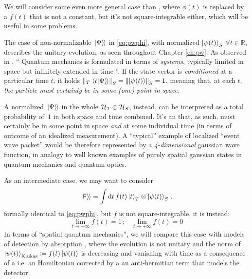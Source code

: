 We will consider some even more general case than \cite{Lloyd:Time},
where $\phi(t)$ is replaced by a $f(t)$ that is not a constant,
but it's not square-integrable either,
which will be useful in some problems.

The case of non-normalizable $\left.\left| \Psi \right\rangle\hspace{-0.115em}\right\rangle$ in \eqref{eq:pwphi},
with normalized $\ket{\psi(t)}_S$ $\forall t \in \mathbb{R}$,
describes the unitary evolution, as seen throughout Chapter \ref{ch:pw}.
As observed in \cite{Maccone:QGR},
``%
  Quantum mechanics is formulated in terms of \emph{systems},
  typically limited in space but infinitely extended in time%
''.
If the state vector is \emph{conditioned} at a particular time $t$,
it holds $\norm{_{T}\left.\left\langle t \middle| \Psi \right\rangle\hspace{-0.115em}\right\rangle}_S = \norm{\ket{\psi(t)}}_S = 1$,
meaning that, at each $t$,
\emph{the particle must certainly be in some (one) point in space}.

A normalized $\left.\left| \Psi \right\rangle\hspace{-0.115em}\right\rangle$ in the whole $\mathcal{H}_T \otimes \mathcal{H}_S$,
instead,
can be interpreted as a total probability of~$1$ in both space and time combined.
It's an  that, as such, must certainly be in some point in space
\emph{and} at some individual time (in terms of outcome of an idealized measurement).
A ``typical'' example of localized ``event wave packet'' would be
therefore represented by
a \emph{4-dimensional} gaussian wave function,
in analogy to well known examples of purely spatial gaussian states
in quantum mechanics and quantum optics.

\fi

As an intermediate case, we may want to consider
\begin{equation}\label{eq:pwf}
  \left.\left| \mathsf{F} \right\rangle\hspace{-0.115em}\right\rangle =
    \int \dd{t} f(t) \ket{t}_T \otimes \ket{\psi(t)}_S \, \text{.}
\end{equation}
formally identical to \eqref{eq:pwphi},
but $f$ is not square-integrable, it is instead:
\begin{equation}
  \lim_{t\to -\infty} f(t) = 1 \, \text{;} \quad
  \lim_{t\to +\infty} f(t) = 0
\end{equation}
In terms of ``spatial quantum mechanics'', we will compare this case with
models of detection by absorption \parencite{RuschhauptAbsorption},
where the evolution is not unitary and
the norm of
$\ket{\psi(t)}_{\mathrm{Kiukas}} \coloneqq f(t)\ket{\psi(t)}$
is decreasing and vanishing with time
as a consequence of a 
i.e.
an Hamiltonian corrected by a an anti-hermitian term
that models the detector.

